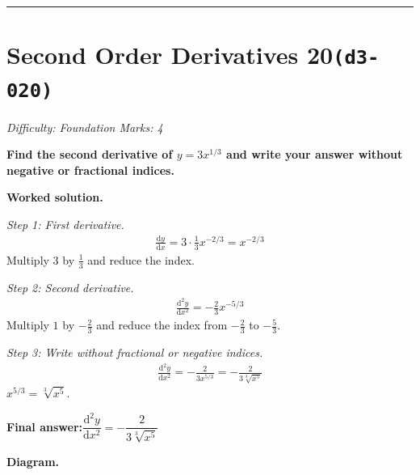 \documentclass[11pt]{article}
\newcommand{\question}[1]{\par\medskip\noindent\textbf{#1}\par}
\begin{document}
\medskip\hrule

\section*{Second Order Derivatives 20\quad\small\texttt{(d3-020)}}
\textit{Difficulty: Foundation \quad\textbar\quad Marks: 4}

\question{Find the second derivative of \( y = 3x^{1/3} \) and write your answer without negative or fractional indices.}

\textbf{Worked solution.}

\textit{Step 1: First derivative.}
\[\begin{gathered}
\frac{\mathrm{d}y}{\mathrm{d}x} = 3 \cdot \tfrac{1}{3} x^{-2/3} = x^{-2/3}
\end{gathered}\]
Multiply \(3\) by \(\tfrac{1}{3}\) and reduce the index.

\textit{Step 2: Second derivative.}
\[\begin{gathered}
\frac{\mathrm{d}^2y}{\mathrm{d}x^2} = -\tfrac{2}{3}x^{-5/3}
\end{gathered}\]
Multiply \(1\) by \(-\tfrac{2}{3}\) and reduce the index from \(-\tfrac{2}{3}\) to \(-\tfrac{5}{3}\).

\textit{Step 3: Write without fractional or negative indices.}
\[\begin{gathered}
\frac{\mathrm{d}^2y}{\mathrm{d}x^2} = -\frac{2}{3x^{5/3}} = -\frac{2}{3\sqrt[3]{x^5}}
\end{gathered}\]
\( x^{5/3} = \sqrt[3]{x^5} \).

\begin{answerbox}
\textbf{Final answer:}\quad \(\displaystyle  \dfrac{\mathrm{d}^2y}{\mathrm{d}x^2} = -\dfrac{2}{3\sqrt[3]{x^5}} \)
\end{answerbox}
\textbf{Diagram.}
\end{document}
